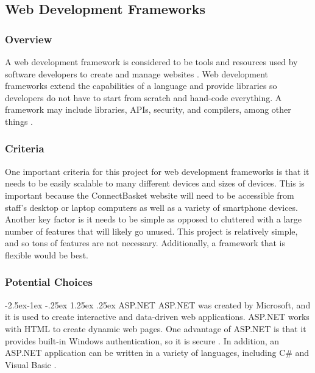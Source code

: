 \documentclass[onecolumn, draftclsnofoot,10pt, compsoc]{IEEEtran}
\makeatletter
\renewcommand\paragraph{\@startsection{paragraph}{4}{\z@}%
            {-2.5ex\@plus -1ex \@minus -.25ex}%
            {1.25ex \@plus .25ex}%
            {\normalfont\normalsize\bfseries}}
\makeatother
\begin{document}
\subsection{Web Development Frameworks}

\subsubsection{Overview}
A web development framework is considered to be tools and resources used by software developers to create and manage websites \cite{webdevframework}. Web development frameworks extend the capabilities of a language and provide libraries so developers do not have to start from scratch and hand-code everything. A framework may include libraries, APIs, security, and compilers, among other things \cite{framework}.

\subsubsection{Criteria}
One important criteria for this project for web development frameworks is that it needs to be easily scalable to many different devices and sizes of devices. This is important because the ConnectBasket website will need to be accessible from staff's desktop or laptop computers as well as a variety of smartphone devices. Another key factor is it needs to be simple as opposed to cluttered with a large number of features that will likely go unused. This project is relatively simple, and so tons of features are not necessary. Additionally, a framework that is flexible would be best. 

\subsubsection{Potential Choices}

\paragraph{ASP.NET} 
ASP.NET was created by Microsoft, and it is used to create interactive and data-driven web applications\cite{asp.net}. ASP.NET works with HTML to create dynamic web pages. One advantage of ASP.NET is that it provides built-in Windows authentication, so it is secure \cite{asp}. In addition, an ASP.NET application can be written in a variety of languages, including C\# and Visual Basic \cite{asp.net}. 
\end{document}
